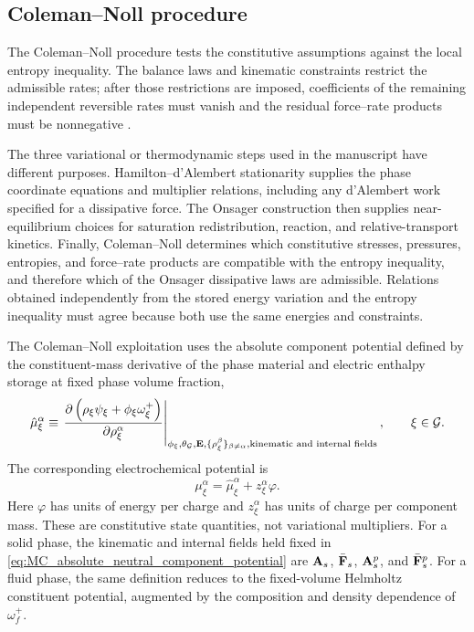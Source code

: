 \subsection{Coleman--Noll procedure}
\label{sec:MC_coleman_noll_procedure}

The Coleman--Noll procedure tests the constitutive assumptions against the
local entropy inequality.  The balance laws and kinematic constraints restrict
the admissible rates; after those restrictions are imposed, coefficients of the
remaining independent reversible rates must vanish and the residual
force--rate products must be nonnegative
\cite{coleman1974thermodynamics}.

The three variational or thermodynamic steps used in the manuscript have
different purposes.  Hamilton--d'Alembert stationarity supplies the phase
coordinate equations and multiplier relations, including any d'Alembert work
specified for a dissipative force.  The Onsager construction then supplies
near-equilibrium choices for saturation redistribution, reaction, and
relative-transport kinetics.  Finally, Coleman--Noll determines which
constitutive stresses, pressures, entropies, and force--rate products are
compatible with the entropy inequality, and therefore which of the Onsager
dissipative laws are admissible.  Relations obtained independently from the
stored energy variation and the entropy inequality must agree because both use
the same energies and constraints.

The Coleman--Noll exploitation uses the absolute component potential
defined by the constituent-mass derivative of the phase material and electric
enthalpy storage at fixed phase volume fraction,
%
\begin{equation}
	\hat\mu_\xi^\alpha
	\equiv
	\left.
	\frac{
		\partial
		\left(
		\rho_\xi\psi_\xi+\phi_\xi\omega_\xi^+
		\right)
	}{
		\partial\rho_\xi^\alpha
	}
	\right\vert_{
		\phi_\xi,\theta_{\mathcal{G}},\mathbf{E},
		\{\rho_\xi^\beta\}_{\beta\ne\alpha},
		\text{kinematic and internal fields}
	},
	\qquad
	\xi\in\mathcal{G} .
	\label{eq:MC_absolute_neutral_component_potential}
\end{equation}
%
The corresponding electrochemical potential is
%
\begin{equation}
	\mu_\xi^\alpha
	=
	\hat\mu_\xi^\alpha+z_\xi^\alpha\varphi .
	\label{eq:C45_combined_def}
\end{equation}
%
Here \(\varphi\) has units of energy per charge and \(z_\xi^\alpha\) has units
of charge per component mass.  These are constitutive state quantities, not
variational multipliers.  For a solid phase, the kinematic and internal fields
held fixed in
\eqref{eq:MC_absolute_neutral_component_potential} are
\(\mathbf{A}_s\), \(\bar{\mathbf{F}}_s\), \(\mathbf{A}_s^p\), and
\(\bar{\mathbf{F}}_s^p\).  For a fluid phase, the same definition reduces to the
fixed-volume Helmholtz constituent potential, augmented by the composition and
density dependence of \(\omega_f^+\).

